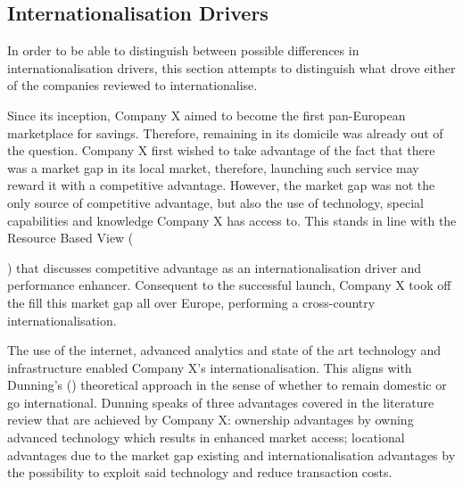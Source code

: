 \documentclass[11pt,a4paper]{article}
\begin{document}
{{\subsection{Internationalisation Drivers}
\label{entry_motives}
In order to be able to distinguish between possible differences in internationalisation drivers, this section attempts to distinguish what drove either of the companies reviewed to internationalise. \par
Since its inception, Company X aimed to become the first pan-European marketplace for savings. Therefore, remaining in its domicile was already out of the question. Company X first wished to take advantage of the fact that there was a market gap in its local market, therefore, launching such service may reward it with a competitive advantage. However, the market gap was not the only source of competitive advantage, but also the use of technology, special capabilities and knowledge Company X has access to. This stands in line with the Resource Based View ({\cite{barneyResourcebasedViewFirm2001}) that discusses competitive advantage as an internationalisation driver and performance enhancer. Consequent to the successful launch, Company X took off the fill this market gap all over Europe, performing a cross-country internationalisation. \par
The use of the internet, advanced analytics and state of the art technology and infrastructure enabled Company X's internationalisation. This aligns with Dunning's (\citeyear{dunningEclecticTheoryInternational1980}) theoretical approach in the sense of whether to remain domestic or go international. Dunning speaks of three advantages covered in the literature review that are achieved by Company X: ownership advantages by owning advanced technology which results in enhanced market access; locational advantages due to the market gap existing and internationalisation advantages by the possibility to exploit said technology and reduce transaction costs.  \par

}}}
\end{document}
